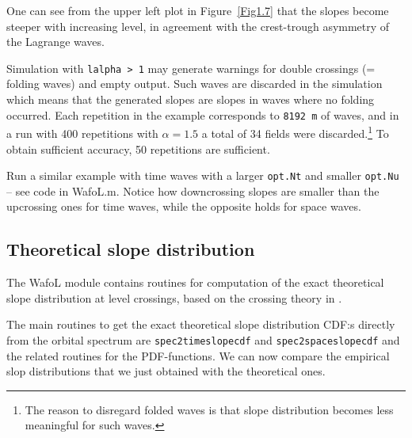 One can see from the upper left plot in Figure~\ref{Fig1.7} that the slopes become steeper
with increasing level, in agreement with the crest-trough asymmetry of the Lagrange waves.


Simulation with {\tt lalpha > 1} may generate warnings for double crossings
(= folding waves) and empty output. Such waves are discarded in the simulation which
means that the generated slopes are slopes in waves where no folding occurred.
Each repetition in the example corresponds to {\tt 8192 m} of waves,
and in a run with 400 repetitions with $\alpha = 1.5$ a total of 34 fields were
discarded.\footnote{The reason to disregard folded waves is that slope distribution
becomes less meaningful for such waves.}
To obtain sufficient accuracy, 50 repetitions are sufficient.

Run a similar example with time waves with a larger {\tt opt.Nt} and smaller
{\tt opt.Nu} -- see code in {\sc Wafo}L.m.
Notice how downcrossing slopes are smaller than the upcrossing
ones for time waves, while the opposite holds for space waves.

\subsection{Theoretical slope distribution}\label{ss:TheoreticalSlopeDistributions}
The {\sc Wafo}L module contains routines for computation of the exact theoretical slope distribution at level crossings, based on the crossing theory in \cite{Lindgren2009Exact,Lindgren2010Slope}.

The main routines to get the exact theoretical slope distribution CDF:s directly from  the orbital
spectrum are {\tt spec2timeslopecdf} and {\tt spec2spaceslopecdf} and the related routines for the PDF-functions. We can now compare the empirical slop distributions that we just obtained with the theoretical ones.

